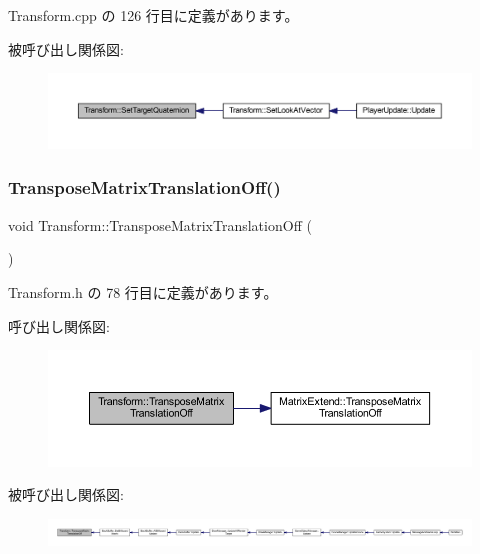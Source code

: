  Transform.\+cpp の 126 行目に定義があります。

被呼び出し関係図\+:\nopagebreak
\begin{figure}[H]
\begin{center}
\leavevmode
\includegraphics[width=350pt]{class_transform_ac8cdb5ca9995d9c124f1890d84c92ab4_icgraph}
\end{center}
\end{figure}
\mbox{\label{class_transform_a053037b225e6fb11e680cc60df15dd45}} 
\subsubsection{\texorpdfstring{Transpose\+Matrix\+Translation\+Off()}{TransposeMatrixTranslationOff()}}
{\footnotesize\ttfamily void Transform\+::\+Transpose\+Matrix\+Translation\+Off (\begin{DoxyParamCaption}{ }\end{DoxyParamCaption})\hspace{0.3cm}{\ttfamily [inline]}}



 Transform.\+h の 78 行目に定義があります。

呼び出し関係図\+:\nopagebreak
\begin{figure}[H]
\begin{center}
\leavevmode
\includegraphics[width=350pt]{class_transform_a053037b225e6fb11e680cc60df15dd45_cgraph}
\end{center}
\end{figure}
被呼び出し関係図\+:
\nopagebreak
\begin{figure}[H]
\begin{center}
\leavevmode
\includegraphics[width=350pt]{class_transform_a053037b225e6fb11e680cc60df15dd45_icgraph}
\end{center}
\end{figure}
\mbox{\label{class_transform_afe5350bb1558256115e14c0669611acd}} 
